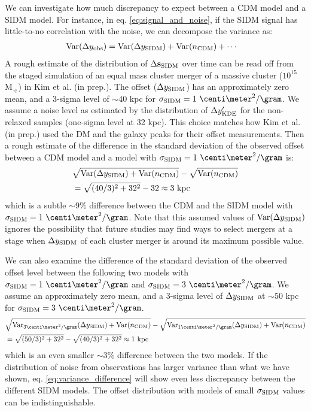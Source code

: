 We can investigate how much discrepancy to expect between a CDM model 
and a SIDM model. 
For instance, in eq. \ref{eq:signal_and_noise},
if the SIDM signal has little-to-no correlation with the noise, 
we can decompose the variance as:
\begin{align}
	\mathrm{Var}(\Delta y_{\rm obs}) &= \mathrm{Var}(\Delta y_{\rm SIDM}) + \mathrm{Var}(n_{\rm CDM}) + \cdots
\end{align}
A rough estimate of the distribution of $\Delta {\bf s}_{\rm SIDM}$ over time 
can be read off from the staged simulation of an equal mass cluster merger of a
massive cluster ($10^{15}$ M$_\sun$) in Kim et al. (in prep.).
The offset ($\Delta y_{\rm SIDM}$) has an approximately zero mean, and a 3-sigma level of
$\sim 40$ kpc for $\sigma_\SIDM = 1~\centi\meter^2 / \gram$.  
We assume a noise level as estimated by the distribution of $\Delta y_{\rm KDE}'$
for the non-relaxed samples (one-sigma level at 32 kpc). This choice matches 
how Kim et al. (in prep.) used the DM and the galaxy peaks for their
offset measurements. 
Then a rough estimate of the difference in the standard deviation of the observed offset 
between a CDM
model and a model with $\sigma_\SIDM = 1~\centi\meter^2 / \gram$ is:
\begin{align}
	&	\sqrt{\mathrm{Var}(\Delta y_{\rm SIDM}) + \mathrm{Var}(n_{\rm CDM})} - \sqrt{\mathrm{Var}(n_{\rm CDM})} \\ 
&=	\sqrt{(40 / 3)^2 + 32^2} - 32 \approx 3~\mathrm{kpc} 
\end{align}
which is a subtle $\sim 9 \%$ difference between the CDM and the SIDM model with
$\sigma_\SIDM = 1~\centi \meter^2 / \gram$. 
Note that this assumed values of $\mathrm{Var}(\Delta y_{\rm SIDM})$  
ignores the possibility
that future studies may find ways to select mergers at a stage when $\Delta y_{\rm SIDM}$
of each cluster merger is around its maximum possible value. 

We can also examine the difference of the standard deviation of the observed
offset level between the following two models with 
$\sigma_\SIDM =1~\centi\meter^2 / \gram$ and  $\sigma_\SIDM = 3~\centi\meter^2 / \gram$.
We assume an approximately zero mean, and a 3-sigma level of $\Delta y_{\rm SIDM}$
at $\sim 50$ kpc for $\sigma_\SIDM =
3~\centi\meter^2 / \gram$.
\begin{align}
	&\sqrt{\Var_{3\centi\meter^2/\gram}(\Delta y_\SIDM) + \Var(n_{\rm CDM})} -
	\sqrt{\Var_{1\centi\meter^2/\gram}(\Delta y_{\SIDM}) +\Var(n_{\rm CDM})}\label{eq:variance_difference}\\ 
&=\sqrt{(50 / 3)^2 + 32^2} - \sqrt{(40 / 3)^2 + 32^2} \approx 1~\mathrm{kpc} 
\end{align}
which is an even smaller $\sim 3\%$ difference between the two models. 
If the distribution of noise from observations has larger variance than what we
have shown, eq. \ref{eq:variance_difference} will show even less discrepancy
between the different SIDM models. 
The offset distribution with models of small $\sigma_{\rm SIDM}$ values 
can be indistinguishable.  

